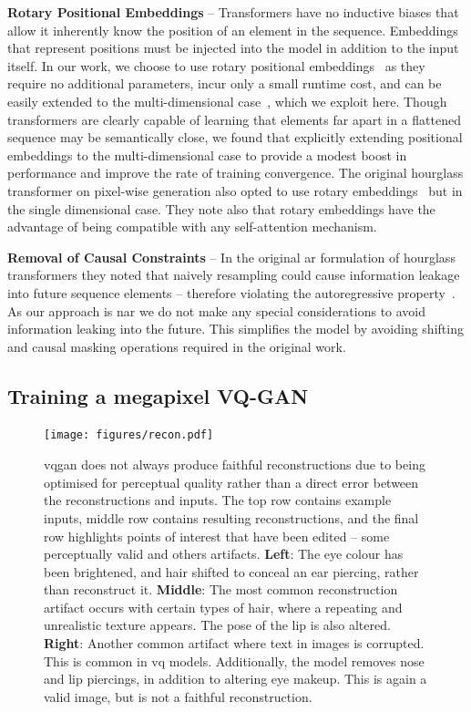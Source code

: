 \textbf{Rotary Positional Embeddings} -- Transformers have no inductive biases
that allow it inherently know the position of an element in the sequence.
Embeddings that represent positions must be injected into the model in addition
to the input itself. In our work, we choose to use rotary positional
embeddings~\cite{su2021roformer} as they require no additional parameters, incur
only a small runtime cost, and can be easily extended to the multi-dimensional
case~\cite{rope-eleutherai}, which we exploit here. Though transformers are
clearly capable of learning that elements far apart in a flattened sequence may
be semantically close, we found that explicitly extending positional embeddings
to the multi-dimensional case to provide a modest boost in performance and
improve the rate of training convergence. The original hourglass transformer on
pixel-wise generation also opted to use rotary
embeddings~\cite{nawrot2021hierarchical} but in the single dimensional case.
They note also that rotary embeddings have the advantage of being compatible
with any self-attention mechanism.

\textbf{Removal of Causal Constraints} -- In the original \gls{ar}
formulation of hourglass transformers they noted that naively resampling could
cause information leakage into future sequence elements -- therefore violating
the autoregressive property~\cite{nawrot2021hierarchical}. As our approach is
\gls{nar} we do not make any special considerations to avoid information leaking
into the future. This simplifies the model by avoiding shifting and causal
masking operations required in the original work.

\subsection{Training a megapixel VQ-GAN}
\label{subsec:megagan}

\begin{figure}[ht]
    \centering
    \texttt{[image: figures/recon.pdf]}
    \caption{
        \Gls{vqgan} does not always produce faithful reconstructions due to
        being optimised for perceptual quality rather than a direct error between
        the reconstructions and inputs. The top row contains example inputs, middle row
        contains resulting reconstructions, and the final row highlights points of interest that
        have been edited -- some perceptually valid and others 
        artifacts. 
        \textbf{Left}: The eye colour has been brightened, and hair
        shifted to conceal an ear piercing, rather than reconstruct it.
        \textbf{Middle}: The most common reconstruction artifact occurs with
        certain types of hair, where a repeating and unrealistic texture appears. The
        pose of the lip is also altered. 
        \textbf{Right}: Another common artifact where text in images is
        corrupted. This is common in \gls{vq} models. Additionally,
        the model removes nose and lip piercings, in addition to altering eye
        makeup. This is again a valid image, but is not a faithful
        reconstruction.}
    \label{fig:recon}
\end{figure}

